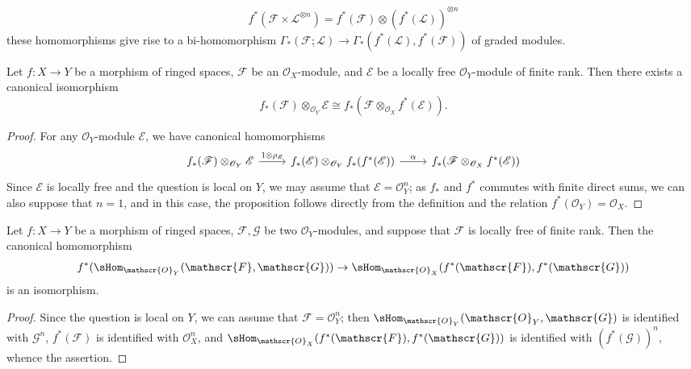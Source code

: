 \[f^*(\mathscr{F}\times\mathscr{L}^{\otimes n})=f^*(\mathscr{F})\otimes(f^*(\mathscr{L}))^{\otimes n}\]
these homomorphisms give rise to a bi-homomorphism $\Gamma_*(\mathscr{F};\mathscr{L})\to\Gamma_*(f^*(\mathscr{L}),f^*(\mathscr{F}))$ of graded modules.
\begin{proposition}\label{sheaf of module local free projection formula}
Let $f:X\to Y$ be a morphism of ringed spaces, $\mathscr{F}$ be an $\mathscr{O}_X$-module, and $\mathscr{E}$ be a locally free $\mathscr{O}_Y$-module of finite rank. Then there exists a canonical isomorphism
\[f_*(\mathscr{F})\otimes_{\mathscr{O}_Y}\mathscr{E}\cong f_*(\mathscr{F}\otimes_{\mathscr{O}_X}f^*(\mathscr{E})).\]
\end{proposition}
\begin{proof}
For any $\mathscr{O}_Y$-module $\mathscr{E}$, we have canonical homomorphisms
\[\begin{tikzcd}
f_*(\mathscr{F})\otimes_{\mathscr{O}_Y}\mathscr{E}\ar[r,"1\otimes\rho_{\mathscr{E}}"]&f_*(\mathscr{E})\otimes_{\mathscr{O}_Y}f_*(f^*(\mathscr{E}))\ar[r,"\alpha"]&f_*(\mathscr{F}\otimes_{\mathscr{O}_X}f^*(\mathscr{E}))
\end{tikzcd}\]
Since $\mathscr{E}$ is locally free and the question is local on $Y$, we may assume that $\mathscr{E}=\mathscr{O}_Y^n$; as $f_*$ and $f^*$ commutes with finite direct sums, we can also suppose that $n=1$, and in this case, the proposition follows directly from the definition and the relation $f^*(\mathscr{O}_Y)=\mathscr{O}_X$.
\end{proof}
\begin{proposition}\label{sheaf of module local free inverse image of Hom}
Let $f:X\to Y$ be a morphism of ringed spaces, $\mathscr{F},\mathscr{G}$ be two $\mathscr{O}_Y$-modules, and suppose that $\mathscr{F}$ is locally free of finite rank. Then the canonical homomorphism
\[f^*(\sHom_{\mathscr{O}_Y}(\mathscr{F},\mathscr{G}))\to\sHom_{\mathscr{O}_X}(f^*(\mathscr{F}),f^*(\mathscr{G}))\]
is an isomorphism.
\end{proposition}
\begin{proof}
Since the question is local on $Y$, we can assume that $\mathscr{F}=\mathscr{O}_Y^n$; then $\sHom_{\mathscr{O}_Y}(\mathscr{O}_Y,\mathscr{G})$ is identified with $\mathscr{G}^n$, $f^*(\mathscr{F})$ is identified with $\mathscr{O}_X^n$, and $\sHom_{\mathscr{O}_X}(f^*(\mathscr{F}),f^*(\mathscr{G}))$ is identified with $(f^*(\mathscr{G}))^n$, whence the assertion.
\end{proof}
